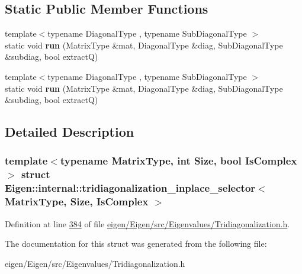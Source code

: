 \subsection*{Static Public Member Functions}
\begin{DoxyCompactItemize}
\item 
\mbox{\label{struct_eigen_1_1internal_1_1tridiagonalization__inplace__selector_aa3eb3bbc4e7086a3ad544980ab86210b}} 
{\footnotesize template$<$typename Diagonal\+Type , typename Sub\+Diagonal\+Type $>$ }\\static void {\bfseries run} (Matrix\+Type \&mat, Diagonal\+Type \&diag, Sub\+Diagonal\+Type \&subdiag, bool extractQ)
\item 
\mbox{\label{struct_eigen_1_1internal_1_1tridiagonalization__inplace__selector_aa3eb3bbc4e7086a3ad544980ab86210b}} 
{\footnotesize template$<$typename Diagonal\+Type , typename Sub\+Diagonal\+Type $>$ }\\static void {\bfseries run} (Matrix\+Type \&mat, Diagonal\+Type \&diag, Sub\+Diagonal\+Type \&subdiag, bool extractQ)
\end{DoxyCompactItemize}


\subsection{Detailed Description}
\subsubsection*{template$<$typename Matrix\+Type, int Size, bool Is\+Complex$>$\newline
struct Eigen\+::internal\+::tridiagonalization\+\_\+inplace\+\_\+selector$<$ Matrix\+Type, Size, Is\+Complex $>$}



Definition at line \hyperlink{eigen_2_eigen_2src_2_eigenvalues_2_tridiagonalization_8h_source_l00384}{384} of file \hyperlink{eigen_2_eigen_2src_2_eigenvalues_2_tridiagonalization_8h_source}{eigen/\+Eigen/src/\+Eigenvalues/\+Tridiagonalization.\+h}.



The documentation for this struct was generated from the following file\+:\begin{DoxyCompactItemize}
\item 
eigen/\+Eigen/src/\+Eigenvalues/\+Tridiagonalization.\+h\end{DoxyCompactItemize}
